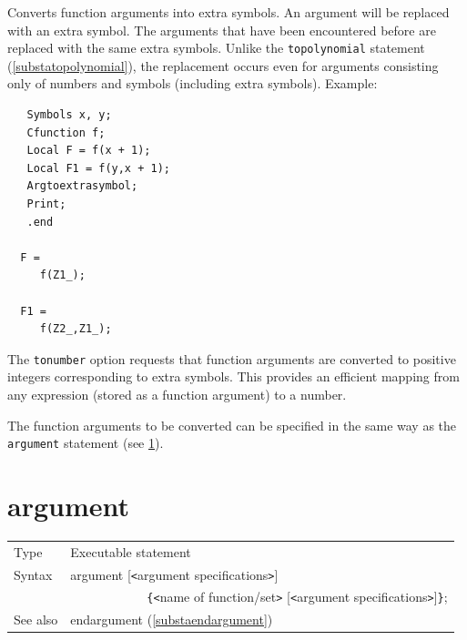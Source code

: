 \noindent
Converts function arguments into extra symbols. 
An argument will be replaced with an extra symbol. 
The arguments that have been encountered before are replaced with the same 
extra symbols. 
Unlike the \texttt{topolynomial} statement (\ref{substatopolynomial}), the 
replacement occurs even for arguments consisting only of numbers and symbols 
(including extra symbols). Example:
\begin{verbatim}
   Symbols x, y;
   Cfunction f;
   Local F = f(x + 1);
   Local F1 = f(y,x + 1);
   Argtoextrasymbol;
   Print;
   .end

  F =
     f(Z1_);

  F1 =
     f(Z2_,Z1_);
\end{verbatim}
\vspace{4mm}

\noindent
The \texttt{tonumber} option requests that function arguments are converted to 
positive integers corresponding to extra symbols. This provides an efficient 
mapping from any expression (stored as a function argument) to a number. 
\vspace{4mm}

\noindent
The function arguments to be converted can be specified in the same way as the 
\texttt{argument} statement (see \ref{substaargument}). 
\vspace{10mm}


\section{argument}
\label{substaargument}

\noindent \begin{tabular}{ll}
Type & Executable statement\\
Syntax & argument [{\tt<}argument specifications{\tt>}] \\ &
    \ \ \ \ \ \ \ \ \ \ \ \
 \verb:{:{\tt<}name of function/set{\tt>}
[{\tt<}argument specifications{\tt>}]\verb:}:; \\
See also & endargument (\ref{substaendargument})
\end{tabular} \vspace{4mm}


